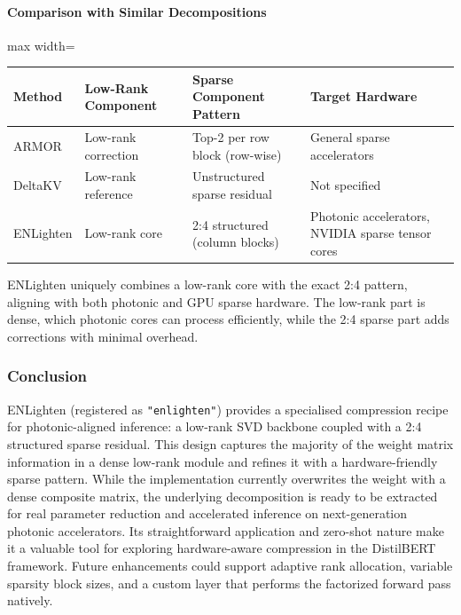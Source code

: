 \paragraph{Comparison with Similar Decompositions}

\begin{center}
\begin{adjustbox}{max width=\columnwidth}
\renewcommand{\arraystretch}{1.2}
\begin{tabular}{llll}
\toprule
Method & Low-Rank Component & Sparse Component Pattern & Target Hardware \\
\midrule
ARMOR & Low-rank correction & Top-2 per row block (row-wise) & General sparse accelerators \\
DeltaKV & Low-rank reference & Unstructured sparse residual & Not specified \\
ENLighten & Low-rank core & 2:4 structured (column blocks) & Photonic accelerators, NVIDIA sparse tensor cores \\

\bottomrule
\end{tabular}
\end{adjustbox}
\end{center}
ENLighten uniquely combines a low-rank core with the exact 2:4 pattern, aligning with both photonic and GPU sparse hardware. The low-rank part is dense, which photonic cores can process efficiently, while the 2:4 sparse part adds corrections with minimal overhead.


\subsubsection*{Conclusion}

ENLighten (registered as \texttt{"enlighten"}) provides a specialised compression recipe for photonic-aligned inference: a low-rank SVD backbone coupled with a 2:4 structured sparse residual. This design captures the majority of the weight matrix information in a dense low-rank module and refines it with a hardware-friendly sparse pattern. While the implementation currently overwrites the weight with a dense composite matrix, the underlying decomposition is ready to be extracted for real parameter reduction and accelerated inference on next-generation photonic accelerators. Its straightforward application and zero-shot nature make it a valuable tool for exploring hardware-aware compression in the DistilBERT framework. Future enhancements could support adaptive rank allocation, variable sparsity block sizes, and a custom layer that performs the factorized forward pass natively.

